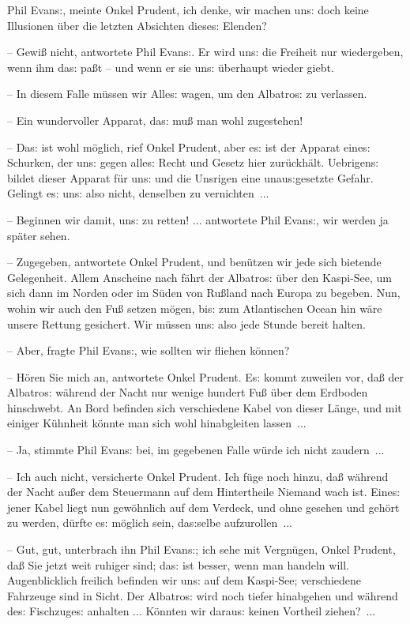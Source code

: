 \documentclass[oneside,12pt]{book}
\newcommand{\s}{s:}
\begin{document}
{\glqq}Phil Evan{\s}, meinte Onkel Prudent, ich denke, wir machen
un{\s} doch keine Illusionen \"uber die letzten Absichten diese{\s}
Elenden?

-- Gewi{\ss} nicht, antwortete Phil Evan{\s}. Er wird un{\s} die
Freiheit nur wiedergeben, wenn ihm da{\s} pa{\ss}t -- und wenn er sie
un{\s} \"uberhaupt wieder giebt.

-- In diesem Falle m\"ussen wir Alle{\s} wagen, um den
{\glqq}Albatro{\s}{\grqq} zu verlassen.

-- Ein wundervoller Apparat, da{\s} mu{\ss} man wohl zugestehen!

-- Da{\s} ist wohl m\"oglich, rief Onkel Prudent, aber e{\s} ist der
Apparat eine{\s} Schurken, der un{\s} gegen alle{\s} Recht und Gesetz
hier zur\"uckh\"alt. Uebrigen{\s} bildet dieser Apparat f\"ur un{\s}
und die Unsrigen eine unau{\s}gesetzte Gefahr. Gelingt e{\s} un{\s}
also nicht, denselben zu vernichten~...

-- Beginnen wir damit, un{\s} zu retten! ... antwortete Phil
Evan{\s}, wir werden ja sp\"ater sehen.

-- Zugegeben, antwortete Onkel Prudent, und ben\"utzen wir jede sich
bietende Gelegenheit. Allem Anscheine nach f\"ahrt der
{\glqq}Albatro{\s}{\grqq} \"uber den Kaspi-See, um sich dann im
Norden oder im S\"uden von Ru{\ss}land nach Europa zu begeben. Nun,
wohin wir auch den Fu{\ss} setzen m\"ogen, bi{\s} zum Atlantischen
Ocean hin w\"are unsere Rettung gesichert. Wir m\"ussen un{\s} also
jede Stunde bereit halten.

-- Aber, fragte Phil Evan{\s}, wie sollten wir fliehen k\"onnen?

-- H\"oren Sie mich an, antwortete Onkel Prudent. E{\s} kommt
zuweilen vor, da{\ss} der {\glqq}Albatro{\s}{\grqq} w\"ahrend der
Nacht nur wenige hundert Fu{\ss} \"uber dem Erdboden hinschwebt. An
Bord befinden sich verschiedene Kabel von dieser L\"ange, und mit
einiger K\"uhnheit k\"onnte man sich wohl hinabgleiten lassen~...

-- Ja, stimmte Phil Evan{\s} bei, im gegebenen Falle w\"urde ich
nicht zaudern~...

-- Ich auch nicht, versicherte Onkel Prudent. Ich f\"uge noch hinzu,
da{\ss} w\"ahrend der Nacht au{\ss}er dem Steuermann auf dem
Hintertheile Niemand wach ist. Eine{\s} jener Kabel liegt nun
gew\"ohnlich auf dem Verdeck, und ohne gesehen und geh\"ort zu
werden, d\"urfte e{\s} m\"oglich sein, da{\s}selbe aufzurollen~...

-- Gut, gut, unterbrach ihn Phil Evan{\s}; ich sehe mit Vergn\"ugen,
Onkel Prudent, da{\ss} Sie jetzt weit ruhiger sind; da{\s} ist
besser, wenn man handeln will. Augenblicklich freilich befinden wir
un{\s} auf dem Kaspi-See; verschiedene Fahrzeuge sind in Sicht. Der
{\glqq}Albatro{\s}{\grqq} wird noch tiefer hinabgehen und w\"ahrend
de{\s} Fischzuge{\s} anhalten ... K\"onnten wir darau{\s} keinen
Vortheil ziehen?~...
\end{document}
